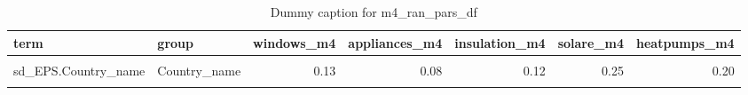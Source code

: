 \begin{table}
\centering
\caption{Dummy caption for m4_ran_pars_df}
\centering
\fontsize{10}{12}\selectfont
\begin{tabular}[t]{llrrrrr}
\toprule
term & group & windows\_m4 & appliances\_m4 & insulation\_m4 & solare\_m4 & heatpumps\_m4\\
\midrule
\cellcolor{gray!10}{sd\_(Intercept).Country\_name} & \cellcolor{gray!10}{Country\_name} & \cellcolor{gray!10}{0.25} & \cellcolor{gray!10}{0.14} & \cellcolor{gray!10}{0.22} & \cellcolor{gray!10}{0.42} & \cellcolor{gray!10}{0.34}\\
sd\_EPS.Country\_name & Country\_name & 0.13 & 0.08 & 0.12 & 0.25 & 0.20\\
\cellcolor{gray!10}{cor\_(Intercept).EPS.Country\_name} & \cellcolor{gray!10}{Country\_name} & \cellcolor{gray!10}{-0.11} & \cellcolor{gray!10}{-0.17} & \cellcolor{gray!10}{-0.13} & \cellcolor{gray!10}{-0.10} & \cellcolor{gray!10}{-0.08}\\
\bottomrule
\end{tabular}
\end{table}
